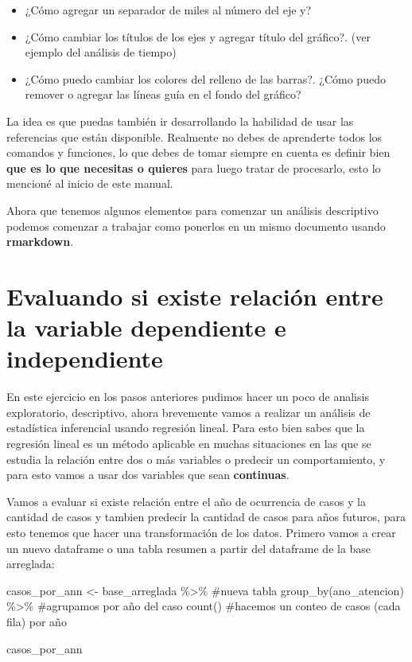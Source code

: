 \documentclass[
  letterpaper,
  DIV=11,
  numbers=noendperiod]{scrreprt}
\newenvironment{Shaded}{\begin{snugshade}}{\end{snugshade}}
\newcommand{\CommentTok}[1]{\textcolor[rgb]{0.37,0.37,0.37}{#1}}
\newcommand{\FunctionTok}[1]{\textcolor[rgb]{0.28,0.35,0.67}{#1}}
\newcommand{\NormalTok}[1]{\textcolor[rgb]{0.00,0.23,0.31}{#1}}
\newcommand{\OtherTok}[1]{\textcolor[rgb]{0.00,0.23,0.31}{#1}}
\newcommand{\SpecialCharTok}[1]{\textcolor[rgb]{0.37,0.37,0.37}{#1}}
\begin{document}
\begin{itemize}
\item
  ¿Cómo agregar un separador de miles al número del eje y?
\item
  ¿Cómo cambiar los títulos de los ejes y agregar título del gráfico?.
  (ver ejemplo del análisis de tiempo)
\item
  ¿Cómo puedo cambiar los colores del relleno de las barras?. ¿Cómo
  puedo remover o agregar las líneas guía en el fondo del gráfico?
\end{itemize}

La idea es que puedas también ir desarrollando la habilidad de usar las
referencias que están disponible. Realmente no debes de aprenderte todos
los comandos y funciones, lo que debes de tomar siempre en cuenta es
definir bien \textbf{que es lo que necesitas o quieres} para luego
tratar de procesarlo, esto lo mencioné al inicio de este manual.

Ahora que tenemos algunos elementos para comenzar un análisis
descriptivo podemos comenzar a trabajar como ponerlos en un mismo
documento usando \textbf{rmarkdown}.

\section{Evaluando si existe relación entre la variable dependiente e
independiente}\label{evaluando-si-existe-relaciuxf3n-entre-la-variable-dependiente-e-independiente}

En este ejercicio en los pasos anteriores pudimos hacer un poco de
analisis exploratorio, descriptivo, ahora brevemente vamos a realizar un
análisis de estadística inferencial usando regresión lineal. Para esto
bien sabes que la regresión lineal es un método aplicable en muchas
situaciones en las que se estudia la relación entre dos o más variables
o predecir un comportamiento, y para esto vamos a usar dos variables que
sean \textbf{continuas}.

Vamos a evaluar si existe relación entre el año de ocurrencia de casos y
la cantidad de casos y tambien predecir la cantidad de casos para años
futuros, para esto tenemos que hacer una transformación de los datos.
Primero vamos a crear un nuevo dataframe o una tabla resumen a partir
del dataframe de la base arreglada:

\begin{Shaded}
\begin{Highlighting}[]
\NormalTok{casos\_por\_ann }\OtherTok{\textless{}{-}}\NormalTok{ base\_arreglada }\SpecialCharTok{\%\textgreater{}\%} \CommentTok{\#nueva tabla}
  \FunctionTok{group\_by}\NormalTok{(ano\_atencion) }\SpecialCharTok{\%\textgreater{}\%}        \CommentTok{\#agrupamos por año del caso}
  \FunctionTok{count}\NormalTok{()                           }\CommentTok{\#hacemos un conteo de casos (cada fila) por año}


\NormalTok{casos\_por\_ann}
\end{Highlighting}
\end{Shaded}
\end{document}
